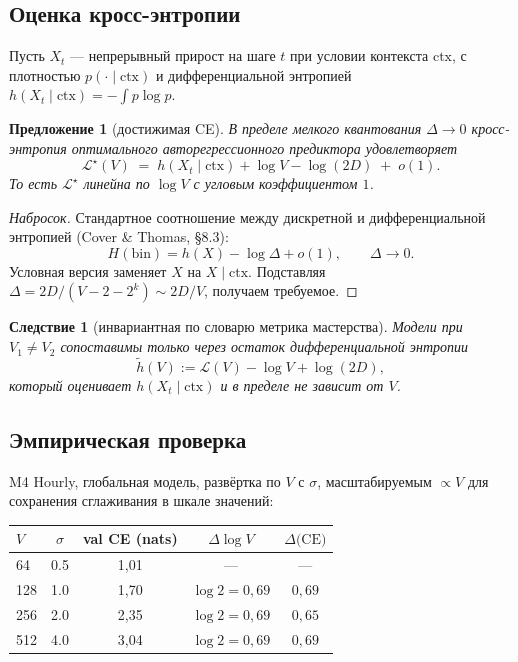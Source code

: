 \documentclass[11pt]{article}
\newtheorem{proposition}[theorem]{Предложение}
\newtheorem{corollary}[theorem]{Следствие}
\theoremstyle{remark}
\begin{document}
\subsection{Оценка кросс-энтропии}

Пусть $X_t$ --- непрерывный прирост на шаге $t$ при условии контекста
$\mathrm{ctx}$, с плотностью $p(\cdot \mid \mathrm{ctx})$ и
дифференциальной энтропией $h(X_t \mid \mathrm{ctx}) = -\int p \log p$.

\begin{proposition}[достижимая CE]
\label{prop:ce}
В пределе мелкого квантования $\Delta \to 0$ кросс-энтропия оптимального
авторегрессионного предиктора удовлетворяет
\begin{equation}
\mathcal{L}^\star(V) \;=\; h(X_t \mid \mathrm{ctx}) + \log V - \log(2D) \;+\; o(1).
\end{equation}
То есть $\mathcal L^\star$ линейна по $\log V$ с угловым коэффициентом $1$.
\end{proposition}

\begin{proof}[Набросок]
Стандартное соотношение между дискретной и дифференциальной энтропией
(Cover \& Thomas, \S 8.3):
\begin{equation}
H(\mathrm{bin}) = h(X) - \log \Delta + o(1), \qquad \Delta \to 0.
\end{equation}
Условная версия заменяет $X$ на $X \mid \mathrm{ctx}$. Подставляя
$\Delta = 2D/(V - 2 - 2^k) \sim 2D/V$, получаем требуемое.
\end{proof}

\begin{corollary}[инвариантная по словарю метрика мастерства]
\label{cor:skill}
Модели при $V_1 \ne V_2$ сопоставимы только через остаток
дифференциальной энтропии
\begin{equation}
\tilde h(V) := \mathcal L(V) - \log V + \log(2D),
\end{equation}
который оценивает $h(X_t \mid \mathrm{ctx})$ и в пределе не зависит от $V$.
\end{corollary}

\subsection{Эмпирическая проверка}

M4 Hourly, глобальная модель, развёртка по $V$ с $\sigma$,
масштабируемым $\propto V$ для сохранения сглаживания в шкале значений:

\begin{center}
\begin{tabular}{lcccc}
\toprule
$V$ & $\sigma$ & val CE (nats) & $\Delta \log V$ & $\Delta \text{(CE)}$ \\
\midrule
64   & 0.5 & 1{,}01 & --- & --- \\
128  & 1.0 & 1{,}70 & $\log 2 = 0{,}69$ & $0{,}69$ \\
256  & 2.0 & 2{,}35 & $\log 2 = 0{,}69$ & $0{,}65$ \\
512  & 4.0 & 3{,}04 & $\log 2 = 0{,}69$ & $0{,}69$ \\
\bottomrule
\end{tabular}
\end{center}
\end{document}
